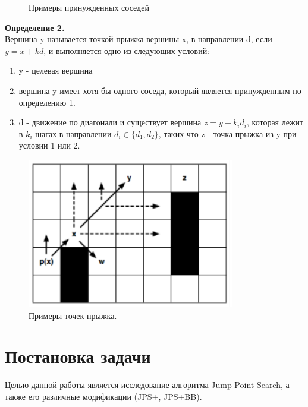 \documentclass{physlab}
\begin{document}
\begin{figure}[H]
\begin{minipage}[h]{0.55\linewidth}
\end{minipage}
\hfill
\begin{minipage}[h]{0.44\linewidth}
\end{minipage}
\caption{Примеры принужденных соседей}
\end{figure} 

\textbf{Определение 2.} \\
Вершина y называется точкой прыжка вершины x, в направлении d, если  $y = x + kd$, и выполняется одно из следующих условий:
\begin{enumerate}
    \item y - целевая вершина
    \item вершина y имеет хотя бы одного соседа, который является принужденным по определению 1.
    \item d - движение по диагонали и существует вершина $z = y + k_{i} d_{i}$, которая лежит в $k_{i}$ шагах в направлении $d_{i} \in \{d_{1}, d_{2} \}$, таких что z - точка прыжка из y при условии 1 или 2.
\end{enumerate}

\begin{figure}[H] 
\centering
    \includegraphics[width=0.4\linewidth]{2.png}
    \caption{Примеры точек прыжка.}
\end{figure}

\section{Постановка задачи}
Целью данной работы является исследование алгоритма Jump Point Search, а также его различные модификации (JPS+, JPS+BB). 
\end{document}

